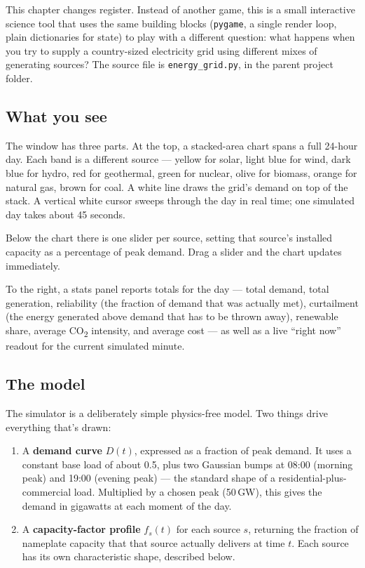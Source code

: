 This chapter changes register. Instead of another game, this is a
small interactive science tool that uses the same building blocks
(\texttt{pygame}, a single render loop, plain dictionaries for state)
to play with a different question: what happens when you try to
supply a country-sized electricity grid using different mixes of
generating sources? The source file is \texttt{energy\_grid.py}, in
the parent project folder.

\subsection*{What you see}

The window has three parts. At the top, a stacked-area chart spans a
full 24-hour day. Each band is a different source --- yellow for
solar, light blue for wind, dark blue for hydro, red for geothermal,
green for nuclear, olive for biomass, orange for natural gas, brown
for coal. A white line draws the grid's demand on top of the stack.
A vertical white cursor sweeps through the day in real time; one
simulated day takes about 45 seconds.

Below the chart there is one slider per source, setting that
source's installed capacity as a percentage of peak demand. Drag a
slider and the chart updates immediately.

To the right, a stats panel reports totals for the day --- total
demand, total generation, reliability (the fraction of demand that
was actually met), curtailment (the energy generated above demand
that has to be thrown away), renewable share, average CO\textsubscript{2}
intensity, and average cost --- as well as a live ``right now''
readout for the current simulated minute.

\subsection*{The model}

The simulator is a deliberately simple physics-free model. Two
things drive everything that's drawn:

\begin{enumerate}
    \item A \textbf{demand curve} $D(t)$, expressed as a fraction of
    peak demand. It uses a constant base load of about 0.5, plus two
    Gaussian bumps at 08:00 (morning peak) and 19:00 (evening peak)
    --- the standard shape of a residential-plus-commercial load.
    Multiplied by a chosen peak (50\,GW), this gives the demand in
    gigawatts at each moment of the day.

    \item A \textbf{capacity-factor profile} $f_s(t)$ for each
    source $s$, returning the fraction of nameplate capacity that
    that source actually delivers at time $t$. Each source has its
    own characteristic shape, described below.
\end{enumerate}

